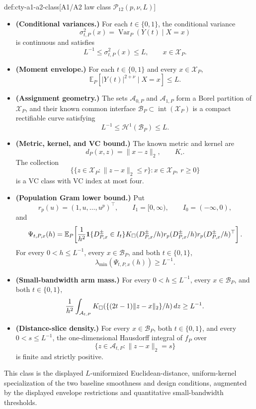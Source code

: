 \begin{definitionv}{def:cty-a1-a2-class}[A1/A2 law class \(\mathcal P_{12}(p,\nu,L)\)]
\begin{itemize}
\item \textbf{(Conditional variances.)} For each \(t\in\{0,1\}\), the conditional variance
\[
\sigma^2_{t,P}(x)=\operatorname{Var}_P(Y(t)\mid X=x)
\]
is continuous and satisfies
\[
L^{-1}\leq\sigma^2_{t,P}(x)\leq L,
\qquad x\in\mathcal X_P.
\]

\item \textbf{(Moment envelope.)} For each \(t\in\{0,1\}\) and every \(x\in\mathcal X_P\),
\[
\mathbb E_P[|Y(t)|^{2+\nu}\mid X=x]\leq L.
\]

\item \textbf{(Assignment geometry.)} The sets \(\mathcal A_{0,P}\) and \(\mathcal A_{1,P}\) form a Borel partition of \(\mathcal X_P\), and their known common interface \(\mathcal B_P\subset\operatorname{int}(\mathcal X_P)\) is a compact rectifiable curve satisfying
\[
L^{-1}\leq\mathcal H^1(\mathcal B_P)\leq L.
\]

\item \textbf{(Metric, kernel, and VC bound.)} The known metric and kernel are
\[
d_P(x,z)=\lVert x-z\rVert_2,
\qquad
K_\square.
\]
The collection
\[
\{\{z\in\mathcal X_P:\lVert z-x\rVert_2\leq r\}:x\in\mathcal X_P,\ r\geq0\}
\]
is a VC class with VC index at most four.

\item \textbf{(Population Gram lower bound.)} Put
\[
r_p(u)=(1,u,\ldots,u^p)^\top,
\qquad
I_1=[0,\infty),
\qquad
I_0=(-\infty,0),
\]
and
\[
\Psi_{t,P,x}(h)
=
\mathbb E_P\!\left[
{1\over h^2}\mathbf 1\{D^{\pm}_{P,x}\in I_t\}
K_\square(D^{\pm}_{P,x}/h)
r_p(D^{\pm}_{P,x}/h)r_p(D^{\pm}_{P,x}/h)^\top
\right].
\]
For every \(0<h\leq L^{-1}\), every \(x\in\mathcal B_P\), and both \(t\in\{0,1\}\),
\[
\lambda_{\min}(\Psi_{t,P,x}(h))\geq L^{-1}.
\]

\item \textbf{(Small-bandwidth arm mass.)} For every \(0<h\leq L^{-1}\), every \(x\in\mathcal B_P\), and both \(t\in\{0,1\}\),
\[
{1\over h^2}\int_{\mathcal A_{t,P}}
K_\square(\{(2t-1)\lVert z-x\rVert_2\}/h)\,dz
\geq L^{-1}.
\]

\item \textbf{(Distance-slice density.)} For every \(x\in\mathcal B_P\), both \(t\in\{0,1\}\), and every \(0<s\leq L^{-1}\), the one-dimensional Hausdorff integral of \(f_P\) over
\[
\{z\in\mathcal A_{t,P}:\lVert z-x\rVert_2=s\}
\]
is finite and strictly positive.
\end{itemize}

This class is the displayed \(L\)-uniformized Euclidean-distance, uniform-kernel specialization of the two baseline smoothness and design conditions, augmented by the displayed envelope restrictions and quantitative small-bandwidth thresholds.
\end{definitionv}

